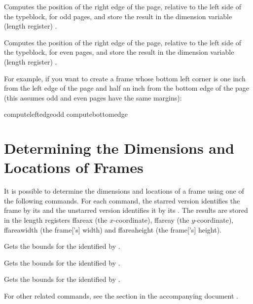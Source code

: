 \documentclass[fontsize=12pt]{scrbook}
\begin{document}
Computes the position of the right edge of the page, 
relative to the left side of the \gls*{typeblock}, for odd pages, and store the result in
the dimension variable (length register) .

Computes the position of the right edge of the page, 
relative to the left side of the \gls*{typeblock}, for even pages, and store the result in
the dimension variable (length register) .

For example, if you want to create a frame whose bottom
left corner is one inch from the left edge of the page
and half an inch from the bottom edge of the page (this
assumes odd and even pages have the same margins):
\begin{codebox}[before upper app=\small]
\gls{computeleftedgeodd}
\gls{computebottomedge}
\marg{1in}
\marg{0.5in}
\end{codebox}

\section{Determining the Dimensions and Locations of Frames}
\label{sec:frameloc}

It is possible to determine the dimensions and locations
of a \gls{frame} using one of the following commands.
For each command, the starred version identifies the \gls{frame} by
its  and the unstarred version identifies it by its
. The results are stored in the length registers
\gls{ffareax} (the $x$-coordinate), \gls{ffareay} (the
$y$-coordinate), \gls{ffareawidth} (the \gls{frame}['s] width)
and \gls{ffareaheight} (the \gls{frame}['s] height).

Gets the bounds for the  identified by .

Gets the bounds for the  identified by .

Gets the bounds for the  identified by .

For other related commands, see the section  in the accompanying document 
.
\end{document}
